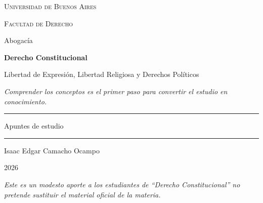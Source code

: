 \documentclass[12pt,oneside]{book}
\newcommand{\universidad}{Universidad de Buenos Aires}
\newcommand{\facultad}{Facultad de Derecho}
\newcommand{\carrera}{Abogacía}
\newcommand{\materia}{Derecho Constitucional}
\newcommand{\titulo}{Libertad de Expresión, Libertad Religiosa y Derechos Políticos}
\newcommand{\autor}{Isaac Edgar Camacho Ocampo}
\newcommand{\anio}{2026}
\begin{document}
\begin{titlepage}

\thispagestyle{empty}

\begin{center}

\vspace*{1cm}

{\large \textsc{\universidad}}

\vspace{0.2cm}

{\large \textsc{\facultad}}

\vspace{0.2cm}

{\large \carrera}

\vspace{3cm}

{\Huge \textbf{\materia}}

\vspace{1cm}

{\LARGE \titulo}

\vspace{0.8cm}

\textit{Comprender los conceptos es el primer paso para convertir el estudio en conocimiento.}

\vspace{1.2cm}

\rule{0.70\textwidth}{0.5pt}

\vspace{0.5cm}

{\large Apuntes de estudio}

\vspace{0.5cm}

\rule{0.70\textwidth}{0.5pt}

\vfill

{\large \autor}

\vspace{0.3cm}

{\large \anio}

\end{center}

\vfill

\begin{flushleft}
\textit{Este es un modesto aporte a los estudiantes de ``Derecho Constitucional'' no pretende sustituir el material oficial de la materia.}
\end{flushleft}

\end{titlepage}
\end{document}
